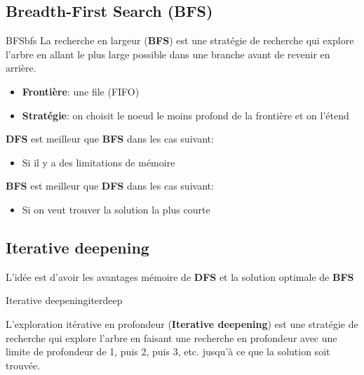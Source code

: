 \subsection{Breadth-First Search (BFS)} %
\label{sub:bfs} 

\begin{definition}{BFS}{bfs}
    La recherche en largeur (\textbf{BFS}) est une stratégie de recherche qui explore l'arbre en allant le plus large possible dans une branche avant de revenir en arrière. 
    \begin{itemize}
        \item \textbf{Frontière}: une file (FIFO)
        \item \textbf{Stratégie}: on choisit le noeud le moins profond de la frontière et on l'étend
    \end{itemize} 
\end{definition} 

\textbf{DFS} est meilleur que \textbf{BFS} dans les cas suivant: 
\begin{itemize}
    \item Si il y a des limitations de mémoire 
\end{itemize}

\textbf{BFS} est meilleur que \textbf{DFS} dans les cas suivant: 
\begin{itemize}
    \item Si on veut trouver la solution la plus courte
\end{itemize}

\subsection{Iterative deepening} %
\label{sub:iterative_deepening}
\begin{note}
    L'idée est d'avoir les avantages mémoire de \textbf{DFS} et la solution optimale de \textbf{BFS}
\end{note}

\begin{definition}{Iterative deepening}{iterdeep}

    L'exploration itérative en profondeur (\textbf{Iterative deepening}) est une stratégie de 
    recherche qui explore l'arbre en faisant une recherche en profondeur avec une limite de profondeur de 
    1, puis 2, puis 3, etc. jusqu'à ce que la solution soit trouvée.


\end{definition}

